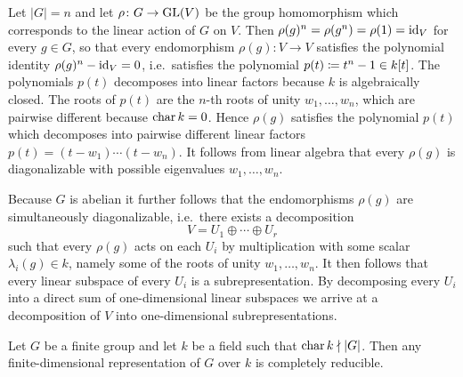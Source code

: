 \begin{example}
\begin{enumerate}
      Let $|G| = n$ and let $\rho \colon G \to \operatorname{GL}(V)$ be the group homomorphism which corresponds to the linear action of $G$ on $V$.
      Then $\rho(g)^n = \rho(g^n) = \rho(1) = \operatorname{id}_V$ for every $g \in G$, so that every endomorphism $\rho(g) \colon V \to V$ satisfies the polynomial identity $\rho(g)^n - \operatorname{id}_V = 0$, i.e.\ satisfies the polynomial $p(t) \coloneqq t^n - 1 \in k[t]$.
      The polynomials $p(t)$ decomposes into linear factors because $k$ is algebraically closed.
      The roots of $p(t)$ are the $n$-th roots of unity $w_1, \dotsc, w_n$, which are pairwise different because $\operatorname{char} k = 0$.
      Hence $\rho(g)$ satisfies the polynomial $p(t)$ which decomposes into pairwise different linear factors $p(t) = (t - w_1) \dotsm (t - w_n)$.
      It follows from linear algebra that every $\rho(g)$ is diagonalizable with possible eigenvalues $w_1, \dotsc, w_n$.
      
      Because $G$ is abelian it further follows that the endomorphisms $\rho(g)$ are simultaneously diagonalizable, i.e.\ there exists a decomposition
      \[
          V
        = U_1 \oplus \dotsb \oplus U_r
      \]
      such that every $\rho(g)$ acts on each $U_i$ by multiplication with some scalar $\lambda_i(g) \in k$, namely some of the roots of unity $w_1, \dotsc, w_n$.
      It then follows that every linear subspace of every $U_i$ is a subrepresentation.
      By decomposing every $U_i$ into a direct sum of one-dimensional linear subspaces we arrive at a decomposition of $V$ into one-dimensional subrepresentations.
  \end{enumerate}
\end{example}



\begin{theorem}
  \label{theorem: maschkes theorem}
  Let $G$ be a finite group and let $k$ be a field such that $\operatorname{char} k \nmid |G|$.
  Then any finite-dimensional representation of $G$ over $k$ is completely reducible.
\end{theorem}


